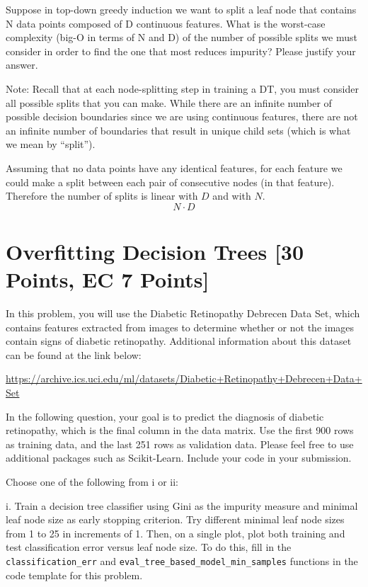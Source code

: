 \problem[4] Suppose in top-down greedy induction we want to split a leaf node that contains N data points composed of
D continuous features. What is the worst-case
complexity (big-O in terms of N and D) of the number of possible splits we must consider in order to find the one that most reduces impurity? Please justify your answer.

Note: Recall that at each node-splitting step in training a DT, you must consider all possible splits that you can make. While there are an infinite number of possible decision boundaries since we are using continuous features, there are not an infinite number of boundaries that result in unique child sets (which is what we mean by ``split'').

\begin{solution}
    Assuming that no data points have any identical features, for each feature we could make a split between each pair of consecutive nodes (in that feature). Therefore the number of splits is linear with $D$ and with $N$.
    $$ N \cdot D $$
\end{solution}


\newpage


\section{Overfitting Decision Trees [30 Points, EC 7 Points]}

In this problem, you will use the Diabetic Retinopathy Debrecen Data Set, which contains features extracted from images to determine whether or not the images contain signs of diabetic retinopathy. Additional information about this dataset can be found at the link below:

\url{https://archive.ics.uci.edu/ml/datasets/Diabetic+Retinopathy+Debrecen+Data+Set}

In the following question, your goal is to predict the diagnosis of diabetic retinopathy, which is the final column in the data matrix.  Use the first 900 rows as training data, and the last
251 rows as validation data. Please feel free to use additional packages such as Scikit-Learn. Include your code in your submission.


\indent\problem[10] \smallskip 
Choose one of the following from i or ii: 

\noindent i. Train a decision tree classifier using Gini as the impurity measure and minimal leaf node size as early stopping criterion. Try different minimal leaf node sizes from 1 to 25 in increments of 1. Then, on a single plot, plot both training and test classification error versus leaf node size. To do this, fill in the \texttt{classification_err} and \texttt{eval_tree_based_model_min_samples} functions in the code template for this problem.


